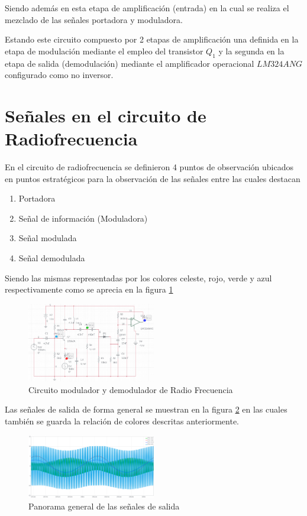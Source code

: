 \documentclass[conference]{IEEEtran}
\begin{document}
	Siendo además en esta etapa de amplificación (entrada) en la cual se realiza el mezclado de las señales portadora y moduladora.
	
	Estando este circuito compuesto por 2 etapas de amplificación una definida en la etapa de modulación mediante el empleo del transistor $Q_1$ y la segunda en la etapa de salida (demodulación) mediante el amplificador operacional $LM324ANG$ configurado como no inversor.
	
	\section{Señales en el circuito de Radiofrecuencia}
	
	En el circuito de radiofrecuencia se definieron 4 puntos de observación ubicados en puntos estratégicos para la observación de las señales entre las cuales destacan
	\begin{enumerate}
		\item Portadora
		\item Señal de información (Moduladora)
		\item Señal modulada
		\item Señal demodulada
	\end{enumerate}
	
	Siendo las mismas representadas por los colores celeste, rojo, verde y azul respectivamente como se aprecia en la figura \ref{fig:circuito-modulador} 
	
	\begin{figure}[h]
		\centering
		\includegraphics[width=0.5\textwidth]{media/circuito-modulador}
		\caption{Circuito modulador y demodulador de Radio Frecuencia}
		\label{fig:circuito-modulador}
	\end{figure}
	
	Las señales de salida de forma general se muestran en la figura \ref{fig:seniales-etapa} en las cuales también se guarda la relación de colores descritas anteriormente.
	
	\begin{figure}[h]
		\centering
		\includegraphics[width=0.5\textwidth]{media/seniales-etapa}
		\caption{Panorama general de las señales de salida}
		\label{fig:seniales-etapa}
	\end{figure}
	
\end{document}
